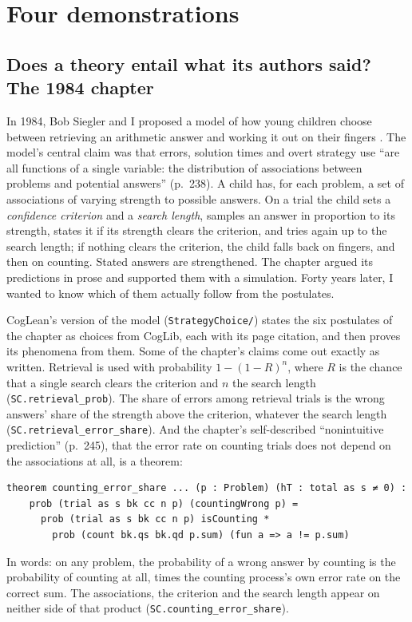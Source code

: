 \documentclass[11pt]{article}
\newcommand{\code}[1]{\texttt{#1}}
\newcommand{\lean}[1]{\texttt{#1}}
\begin{document}
\section{Four demonstrations}
\label{sec:demos}

\subsection{Does a theory entail what its authors said? The 1984 chapter}
\label{sec:doa}

In 1984, Bob Siegler and I proposed a model of how young children
choose between retrieving an arithmetic answer and working it out on
their fingers \citep{siegler1984}. The model's central claim was that
errors, solution times and overt strategy use ``are all functions of a
single variable: the distribution of associations between problems and
potential answers'' (p.~238). A child has, for each problem, a set of
associations of varying strength to possible answers. On a trial the
child sets a \emph{confidence criterion} and a \emph{search length},
samples an answer in proportion to its strength, states it if its
strength clears the criterion, and tries again up to the search
length; if nothing clears the criterion, the child falls back on
fingers, and then on counting. Stated answers are strengthened. The
chapter argued its predictions in prose and supported them with a
simulation. Forty years later, I wanted to know which of them actually
follow from the postulates.

CogLean's version of the model (\code{StrategyChoice/}) states the
six postulates of the chapter as choices from CogLib, each with its
page citation, and then proves its phenomena from them. Some of the
chapter's claims come out exactly as written. Retrieval is used with
probability $1-(1-R)^n$, where $R$ is the chance that a single search
clears the criterion and $n$ the search length
(\lean{SC.retrieval\_prob}). The share of errors among retrieval
trials is the wrong answers' share of the strength above the
criterion, whatever the search length
(\lean{SC.retrieval\_error\_share}). And the chapter's self-described
``nonintuitive prediction'' (p.~245), that the error rate on counting
trials does not depend on the associations at all, is a theorem:
\begin{Verbatim}[fontsize=\small]
theorem counting_error_share ... (p : Problem) (hT : total as s ≠ 0) :
    prob (trial as s bk cc n p) (countingWrong p) =
      prob (trial as s bk cc n p) isCounting *
        prob (count bk.qs bk.qd p.sum) (fun a => a != p.sum)
\end{Verbatim}
In words: on any problem, the probability of a wrong answer by counting
is the probability of counting at all, times the counting process's own
error rate on the correct sum. The associations, the criterion and the
search length appear on neither side of that product
(\lean{SC.counting\_error\_share}).
\end{document}
